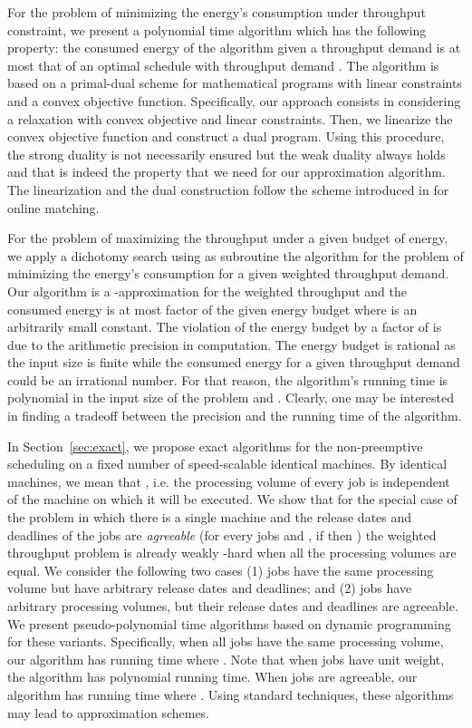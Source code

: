\documentclass[11pt,a4paper]{article}
\begin{document}
For the problem of minimizing the energy's consumption under throughput constraint,
we present a polynomial time algorithm which has the following property: 
the consumed energy
of the algorithm given a throughput demand  is at most that 
of an optimal schedule with throughput demand .  
The algorithm is based on a primal-dual scheme for mathematical programs with 
linear constraints and a convex objective function. Specifically, our approach consists in 
considering a relaxation with convex objective and linear constraints. Then, we
linearize the convex objective function and construct a dual program. Using this procedure,
the strong duality is not necessarily ensured but the weak duality always holds and 
that is indeed the property that we need for our approximation algorithm. The linearization and 
the dual construction follow the scheme introduced in \cite{DevanurJain12:Online-matching}
for online matching.  

For the problem of maximizing 
the throughput under a given budget of energy, we apply a dichotomy search 
using as subroutine the algorithm for the problem of minimizing the energy's consumption for a given weighted throughput demand.
Our algorithm is a -approximation for the weighted throughput  
and the consumed energy is at most  factor of the given energy budget
where  is an arbitrarily small constant. The violation of  the 
energy budget by a factor of  is due to the arithmetic precision in computation.
The energy budget is rational as the input size is finite while the consumed 
energy for a given throughput demand could be an irrational number. For that reason,
the algorithm's running time is polynomial in the input size of the problem 
and  . Clearly, one may be interested in finding a 
tradeoff between the precision and the running time of the algorithm.   
 
 
In Section~\ref{sec:exact}, we propose exact algorithms for the non-preemptive scheduling on 
a fixed number of speed-scalable identical machines. By identical machines, we mean that , 
i.e. the processing volume of every job is independent of the machine on which it will be executed.
We show that for the special case of the problem in which there is a single machine 
and the release dates and deadlines of the jobs are \emph{agreeable} (for every jobs  and , if  then ) the weighted throughput problem is already weakly 
-hard when all the processing volumes are equal. 
We consider the following two cases
 (1) jobs have the same 
processing volume but have arbitrary release dates and deadlines; 
and (2) jobs have arbitrary processing volumes, but their release dates and deadlines are agreeable. We present pseudo-polynomial time algorithms 
based on dynamic programming for these variants. Specifically, when all jobs have the same 
processing volume, our algorithm has running time  where .  
Note that when jobs have unit weight, the algorithm has polynomial running time.
When jobs are agreeable, our algorithm has running time 
where . Using standard techniques, these algorithms may lead to 
approximation schemes. 
\end{document}
